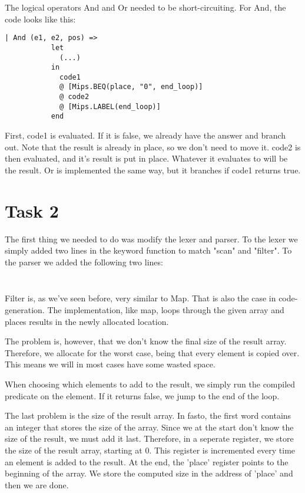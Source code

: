 \documentclass[10pt]{article}
\begin{document}
The logical operators And and Or needed to be short-circuiting. For And, the code looks like this:

\begin{Verbatim}[frame=single]
       | And (e1, e2, pos) =>
           let
             (...)
           in
             code1
             @ [Mips.BEQ(place, "0", end_loop)]
             @ code2
             @ [Mips.LABEL(end_loop)]
           end
\end{Verbatim}
First, code1 is evaluated. If it is false, we already have the answer and branch out. Note that the result is already in place, so we don't need to move it. code2 is then evaluated, and it's result is put in place. Whatever it evaluates to will be the result. Or is implemented the same way, but it branches if code1 returns true.

\section{Task 2}
The first thing we needed to do was modify the lexer and parser. To the lexer we simply added two lines in the keyword function to match "scan" and "filter".
To the parser we added the following two lines:
\begin{Verbatim}[frame=single]

\end{Verbatim}


\begin{Verbatim}[frame=single]

\end{Verbatim}

Filter is, as we've seen before, very similar to Map. That is also the case in code-generation. The implementation, like map, loops through the given array and places results in the newly allocated location.

The problem is, however, that we don't know the final size of the result array. Therefore, we allocate for the worst case, being that every element is copied over. This means we will in most cases have some wasted space.

When choosing which elements to add to the result, we simply run the compiled predicate on the element. If it returns false, we jump to the end of the loop.

The last problem is the size of the result array. In fasto, the first word contains an integer that stores the size of the array. Since we at the start don't know the size of the result, we must add it last. Therefore, in a seperate register, we store the size of the result array, starting at 0. This register is incremented every time an element is added to the result. At the end, the 'place' register points to the beginning of the array. We store the computed size in the address of 'place' and then we are done.
\end{document}
